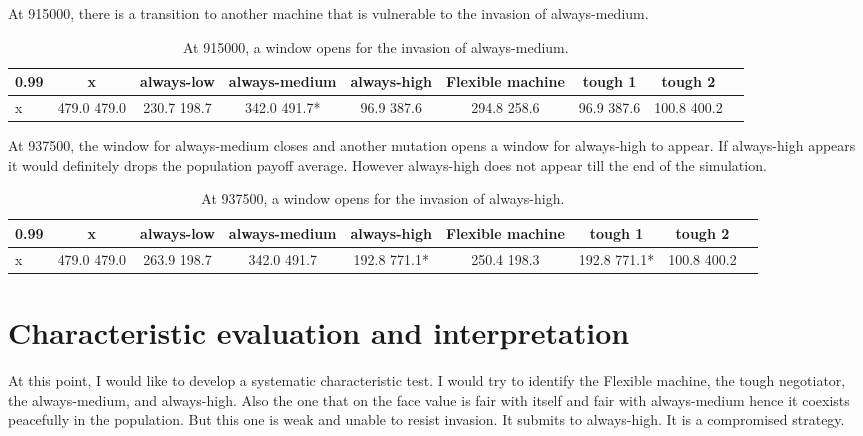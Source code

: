 \documentclass[12.5pt]{report}
\begin{document}
At 915000, there is a transition to another machine that is vulnerable to the invasion of always-medium.
\begin{table}[h!]
\center
\begin{tabular}{l|cccccccc}
\textbf{0.99}& x & always-low & always-medium & always-high & Flexible machine &tough 1 & tough 2\\
\hline
x& 479.0 479.0 & 230.7 198.7 & 342.0 491.7*  &96.9 387.6&  294.8 258.6&   96.9 387.6&  100.8 400.2\\ 
\end{tabular}
\caption{At 915000, a window opens for the invasion of always-medium.}
\end{table}
At 937500, the window for always-medium closes and another mutation opens a window for always-high to appear. If always-high appears it would definitely drops the population payoff average. However always-high does not appear till the end of the simulation.
\begin{table}[h!]
\center
\begin{tabular}{l|cccccccc}
\textbf{0.99}& x & always-low & always-medium & always-high & Flexible machine &tough 1 & tough 2\\
\hline
x& 479.0 479.0&  263.9 198.7&  342.0 491.7&  192.8 771.1*& 250.4 198.3 & 192.8 771.1*& 100.8 400.2 \\
\end{tabular}
\caption{At 937500, a window opens for the invasion of always-high.}
\end{table}

\section{Characteristic evaluation and interpretation}

At this point, I would like to develop a systematic characteristic test. I would try to identify the Flexible machine, the tough negotiator, the always-medium, and always-high. Also the one that on the face value is fair with itself and fair with always-medium hence it coexists peacefully in the population. But this one is weak and unable to resist invasion. It submits to always-high. It is a compromised strategy.\\
\end{document}
